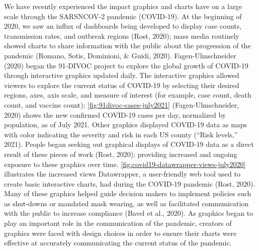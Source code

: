 \documentclass[print]{nuthesis}
\begin{document}
We have recently experienced the impact graphics and charts have on a large scale through the SARSNCOV-2 pandemic (COVID-19).
At the beginning of 2020, we saw an influx of dashboards being developed to display case counts, transmission rates, and outbreak regions (Rost, 2020); mass media routinely showed charts to share information with the public about the progression of the pandemic (Romano, Sotis, Dominioni, \& Guidi, 2020).
Fagen-Ulmschneider (2020) began the 91-DIVOC project to explore the global growth of COVID-19 through interactive graphics updated daily.
The interactive graphics allowed viewers to explore the current status of COVID-19 by selecting their desired regions, axes, axis scale, and measure of interest (for example, case count, death count, and vaccine count); \cref{fig:91divoc-cases-july2021} (Fagen-Ulmschneider, 2020) shows the new confirmed COVID-19 cases per day, normalized by population, as of July 2021.
Other graphics displayed COVID-19 data as maps  with color indicating the severity and risk in each US county ({``Risk levels,''} 2021).
People began seeking out graphical displays of COVID-19 data as a direct result of these pieces of work (Rost, 2020); providing increased and ongoing exposure to these graphics over time.
\cref{fig:covid19-datawrapper-views-july2020} illustrates the increased views Datawrapper, a user-friendly web tool used to create basic interactive charts, had during the COVID-19 pandemic (Rost, 2020).
Many of these graphics helped guide decision makers to implement policies such as shut-downs or mandated mask wearing, as well as facilitated communication with the public to increase compliance (Bavel et al., 2020).
As graphics began to play an important role in the communication of the pandemic, creators of graphics were faced with design choices in order to ensure their charts were effective at accurately communicating the current status of the pandemic.
\end{document}
